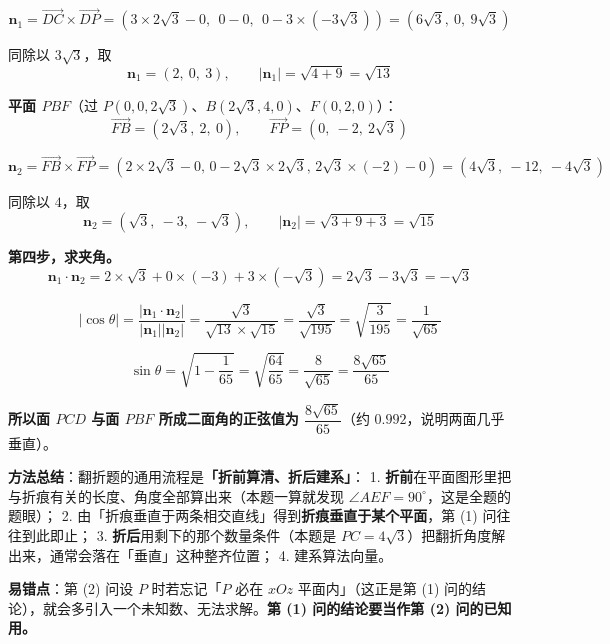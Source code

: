 \[\boldsymbol n_1=\overrightarrow{DC}\times\overrightarrow{DP}=\left(3\times2\sqrt3-0,\ \ 0-0,\ \ 0-3\times\left(-3\sqrt3\right)\right)=\left(6\sqrt3,\ 0,\ 9\sqrt3\right)\]

同除以 $3\sqrt3$，取
\[\boldsymbol n_1=(2,\ 0,\ 3),\qquad\left|\boldsymbol n_1\right|=\sqrt{4+9}=\sqrt{13}\]

\textbf{平面 $PBF$}（过 $P(0,0,2\sqrt3)$、$B\left(2\sqrt3,4,0\right)$、$F(0,2,0)$）：
\[\overrightarrow{FB}=\left(2\sqrt3,\ 2,\ 0\right),\qquad\overrightarrow{FP}=\left(0,\ -2,\ 2\sqrt3\right)\]

\[\boldsymbol n_2=\overrightarrow{FB}\times\overrightarrow{FP}=\left(2\times2\sqrt3-0,\,0-2\sqrt3\times2\sqrt3,\,2\sqrt3\times(-2)-0\right)=\left(4\sqrt3,\ -12,\ -4\sqrt3\right)\]

同除以 $4$，取
\[\boldsymbol n_2=\left(\sqrt3,\ -3,\ -\sqrt3\right),\qquad\left|\boldsymbol n_2\right|=\sqrt{3+9+3}=\sqrt{15}\]

\textbf{第四步，求夹角。}
\[\boldsymbol n_1\cdot\boldsymbol n_2=2\times\sqrt3+0\times(-3)+3\times\left(-\sqrt3\right)=2\sqrt3-3\sqrt3=-\sqrt3\]

\[\left|\cos\theta\right|=\frac{\left|\boldsymbol n_1\cdot\boldsymbol n_2\right|}{\left|\boldsymbol n_1\right|\left|\boldsymbol n_2\right|}=\frac{\sqrt3}{\sqrt{13}\times\sqrt{15}}=\frac{\sqrt3}{\sqrt{195}}=\sqrt{\frac3{195}}=\frac1{\sqrt{65}}\]

\[\sin\theta=\sqrt{1-\frac1{65}}=\sqrt{\frac{64}{65}}=\frac8{\sqrt{65}}=\frac{8\sqrt{65}}{65}\]

\textbf{所以面 $PCD$ 与面 $PBF$ 所成二面角的正弦值为 $\dfrac{8\sqrt{65}}{65}$}（约 $0.992$，说明两面几乎垂直）。

\begin{gktip}
\textbf{方法总结}：翻折题的通用流程是\textbf{「折前算清、折后建系」}：
1. \textbf{折前}在平面图形里把与折痕有关的长度、角度全部算出来（本题一算就发现 $\angle AEF=90^{\circ}$，这是全题的题眼）；
2. 由「折痕垂直于两条相交直线」得到\textbf{折痕垂直于某个平面}，第 (1) 问往往到此即止；
3. \textbf{折后}用剩下的那个数量条件（本题是 $PC=4\sqrt3$）把翻折角度解出来，通常会落在「垂直」这种整齐位置；
4. 建系算法向量。

\textbf{易错点}：第 (2) 问设 $P$ 时若忘记「$P$ 必在 $xOz$ 平面内」（这正是第 (1) 问的结论），就会多引入一个未知数、无法求解。\textbf{第 (1) 问的结论要当作第 (2) 问的已知用。}
\end{gktip}

\par\medskip


